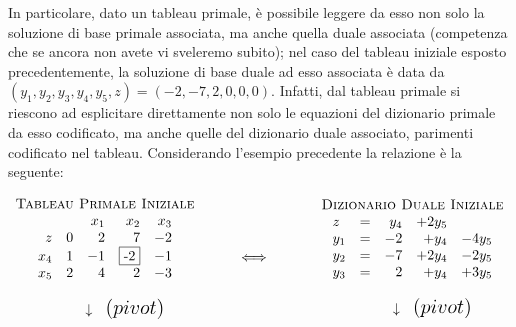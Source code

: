 \documentclass{article}
\begin{document}
  	In particolare, dato un tableau primale, è possibile leggere da esso non solo la soluzione di base primale associata, ma anche quella duale associata (competenza che se ancora non avete vi sveleremo subito); nel caso del tableau iniziale esposto precedentemente, la soluzione di base duale ad esso associata è data da $(y_1,y_2,y_3,y_4,y_5,z)=(-2,-7,2,0,0,0)$. Infatti, dal tableau primale si riescono ad esplicitare direttamente non solo le equazioni del dizionario primale da esso codificato, ma anche quelle del dizionario duale associato, parimenti codificato nel tableau. Considerando l'esempio precedente la relazione \`e la seguente:
  	
  	\[
  	\begin{array}{c}
  	\mbox{\sc Tableau Primale Iniziale}\\
  	\begin{array}{rrrrr}
  	&  & x_1  & x_2 & x_3  \\
  	z  & 0 & 2 &  7   &  -2 \\  	
  	x_4 &  1 & -1  &  \fbox{-2}   &  -1 \\
  	x_5 & 2 & 4 & 2 &  -3 \\
  	\end{array}\\ \\
  	\hspace{1cm} {\Huge \downarrow} {\Large \mbox{ \ $(pivot)$}}
  	\end{array}
  	\hfill
  	\hspace{1cm}
  	{\Huge \Longleftrightarrow}
  	\hfill
  	\hspace{1.2cm}
  	\begin{array}{c}
  	\mbox{\sc Dizionario Duale Iniziale}\\
  	\begin{array}{lcrrr}
  	z &=& y_4 & +2y_5 & \\  	
  	y_{1} &=& -2 & +y_4 & -4y_5  \\
  	y_{2} &=& -7 & +2y_4 & -2y_5 \\
  	y_{3} &=& 2 & +y_4 & +3y_5 \\
   	\end{array}	\\	\\
  	\hspace{1cm} {\Huge \downarrow} {\Large \mbox{ \ $(pivot)$}}
  	\end{array}
  	\]
  	
\end{document}
